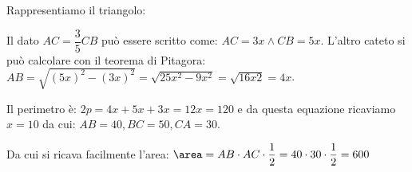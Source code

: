 \begin{soluzione}{}{}
Rappresentiamo il triangolo:


Il dato \(AC=\dfrac{3}{5}CB\) può essere scritto come: \(AC=3x \wedge CB=5x\).
L'altro cateto si può calcolare con il teorema di Pitagora:
\(AB=\sqrt{(5x)^2-(3x)^2}=\sqrt{25x^2-9x^2}=\sqrt{16x2}=4x\).

Il perimetro è: \(2p=4x+5x+3x=12x=120\) e da questa equazione ricaviamo 
\(x=10\) da cui: \(AB=40, BC=50, CA=30\). 

Da cui si ricava facilmente l'area: 
\(\area = AB \cdot AC \cdot \dfrac{1}{2} = 
40 \cdot 30 \cdot \dfrac{1}{2} =600\)
\end{soluzione}
